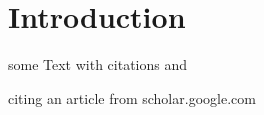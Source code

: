 \documentclass{scrartcl}
\begin{document}
\section{Introduction}

some Text with citations \cite{example} and \cite{example}

citing an article from scholar.google.com \cite{reilly2003science}


\newpage

\printbibliography
\end{document}
